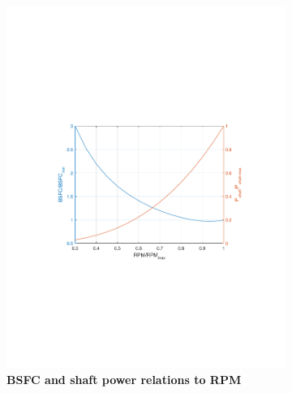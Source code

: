 \documentclass[journal]{aiaa-tc}%
\begin{document}
\begin{figure}[h!]
    \begin{center}
         \begin{subfigure}{0.45\textwidth}
             \includegraphics{BSFC_P_shaftvsRPM}
             \caption{ \textbf{BSFC and shaft power relations to RPM} }
         \end{subfigure}
         \begin{subfigure}{0.45\textwidth}

\end{subfigure}
\end{center}
\end{figure}
\end{document}
